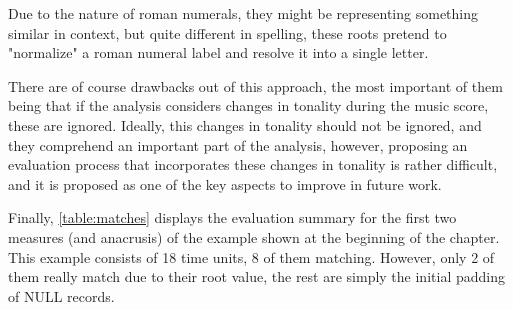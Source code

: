 		Due to the nature of roman numerals, they might be representing something similar in context, but quite different in spelling, these roots pretend to "normalize" a roman numeral label and resolve it into a single letter.

		There are of course drawbacks out of this approach, the most important of them being that if the analysis considers changes in tonality during the music score, these are ignored. Ideally, this changes in tonality should not be ignored, and they comprehend an important part of the analysis, however, proposing an evaluation process that incorporates these changes in tonality is rather difficult, and it is proposed as one of the key aspects to improve in future work.

		Finally, \autoref{table:matches} displays the evaluation summary for the first two measures (and anacrusis) of the example shown at the beginning of the chapter. This example consists of 18 time units, 8 of them matching. However, only 2 of them really match due to their root value, the rest are simply the initial padding of NULL records.

\newpage
